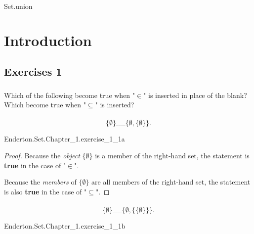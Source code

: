\documentclass{report}
\begin{document}
    {Set.union}

\endgroup

\chapter{Introduction}%

\section{Exercises 1}%

\subsection{}%

  Which of the following become true when "$\in$" is inserted in place of the
    blank?
  Which become true when "$\subseteq$" is inserted?

\subsubsection{}%

  $$\{\emptyset\} \_\_\_\_ \{\emptyset, \{\emptyset\}\}.$$

    {Enderton.Set.Chapter\_1.exercise\_1\_1a}

  \begin{proof}
    Because the \textit{object} $\{\emptyset\}$ is a member of the right-hand
      set, the statement is \textbf{true} in the case of "$\in$".

    Because the \textit{members} of $\{\emptyset\}$ are all members of the
      right-hand set, the statement is also \textbf{true} in the case of
      "$\subseteq$".
  \end{proof}

\subsubsection{}%

  $$\{\emptyset\} \_\_\_\_ \{\emptyset, \{\{\emptyset\}\}\}.$$

    {Enderton.Set.Chapter\_1.exercise\_1\_1b}
\end{document}
